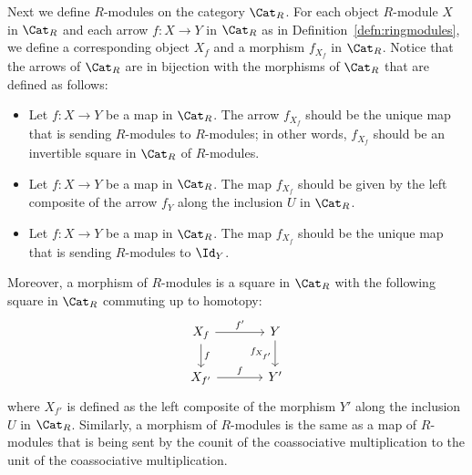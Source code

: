 \documentclass[a4paper,reqno,oneside]{article}
\begin{document}
\medskip

Next we define $R$-modules on the category $\Cat_{R}$. For each object $R$-module $X$ in $\Cat_{R}$ and each arrow $f \colon X \to Y$ in $\Cat_{R}$ as in Definition~\ref{defn:ringmodules}, we define a corresponding object $X_{f}$ and a morphism $f_{X_{f}}$ in $\Cat_{R}$. Notice that the arrows of $\Cat_{R}$ are in bijection with the morphisms of $\Cat_{R}$ that are defined as follows: 
\begin{itemize}
    \item Let $f \colon X \to Y$ be a map in $\Cat_{R}$. The arrow $f_{X_{f}}$ should be the unique map that is sending $R$-modules to $R$-modules; in other words, $f_{X_{f}}$ should be an invertible square in $\Cat_{R}$ of $R$-modules. 
    \item Let $f \colon X \to Y$ be a map in $\Cat_{R}$. The map $f_{X_{f}}$ should be given by the left composite of the arrow $f_{Y}$ along the inclusion $U$ in $\Cat_{R}$. 
    \item Let $f \colon X \to Y$ be a map in $\Cat_{R}$. The map $f_{X_{f}}$ should be the unique map that is sending $R$-modules to $\Id_Y$. 
\end{itemize}

Moreover, a morphism of $R$-modules is a square in $\Cat_{R}$ with the following square in $\Cat_{R}$ commuting up to homotopy:
\[\begin{tikzcd}[column sep = large]
X_{f} & Y \\
X_{f'} & Y'
\arrow["f", from=1-1, to=2-1]
\arrow["f'", from=1-1, to=1-2]
\arrow["{f_{X_{f'}}}"', from=1-2, to=2-2]
\arrow["f", from=2-1, to=2-2]
\end{tikzcd}\]
where $X_{f'}$ is defined as the left composite of the morphism $Y'$ along the inclusion $U$ in $\Cat_{R}$. Similarly, a morphism of $R$-modules is the same as a map of $R$-modules that is being sent by the counit of the coassociative multiplication to the unit of the coassociative multiplication. 


\medskip  
\end{document}
